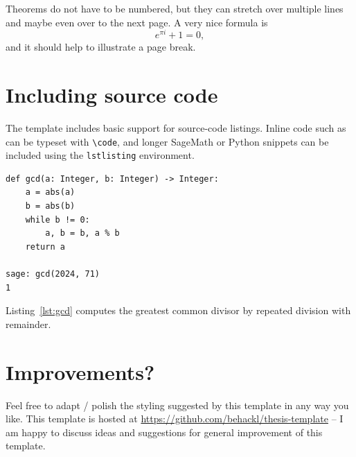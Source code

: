 \documentclass[11pt, twoside, withdegree]{bhthesis}
\begin{document}
\begin{theorem*}
  Theorems do not have to be numbered, but they can stretch over
  multiple lines and maybe even over to the next page. A very nice
  formula is
  \[ e^{\pi i} + 1 = 0, \]
  and it should help to illustrate a page break.
\end{theorem*}

\section{Including source code}

The template includes basic support for source-code listings. Inline code such
as  can be typeset with \verb|\code|, and longer SageMath or
Python snippets can be included using the \texttt{lstlisting} environment.

\begin{lstlisting}[caption={Euclid's algorithm in Sage/Python.}, label={lst:gcd}]
def gcd(a: Integer, b: Integer) -> Integer:
    a = abs(a)
    b = abs(b)
    while b != 0:
        a, b = b, a % b
    return a

sage: gcd(2024, 71)
1
\end{lstlisting}

Listing~\ref{lst:gcd} computes the greatest common divisor by repeated division
with remainder.

\section{Improvements?}

Feel free to adapt / polish the styling suggested by this template
in any way you like. This template is hosted at
\url{https://github.com/behackl/thesis-template} -- I am happy to
discuss ideas and suggestions for general improvement of this template.





\end{document}
